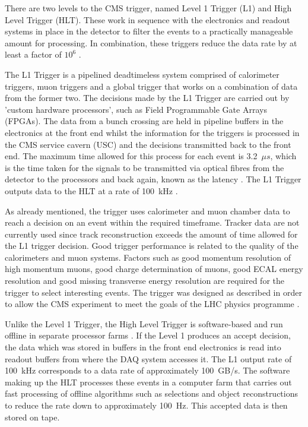 There are two levels to the CMS trigger, named Level 1 Trigger (L1) and High Level Trigger (HLT). These work
in sequence with the electronics and readout systems in place in the detector to filter the events to a
practically manageable amount for processing. In combination, these triggers reduce the data rate by at least
a factor of $10^{6}$ \cite{CMS_experiment}.

The L1 Trigger is a pipelined deadtimeless system comprised of calorimeter triggers, muon triggers and a
global trigger that works on a combination of data from the former two. The decisions made by the L1 Trigger
are carried out by 'custom hardware processors', such as Field Programmable Gate Arrays (FPGAs). The data from
a bunch crossing are held in pipeline buffers in the electronics at the front end whilst the information for
the triggers is processed in the CMS service cavern (USC) and the decisions transmitted back to the front end.
The maximum time allowed for this process for each event is 3.2~$\mu s$, which is the time taken for the
signals to be transmitted via optical fibres from the detector to the processors and back again, known as the
latency \cite{CMS_TDR1}. The L1 Trigger outputs data to the HLT at a rate of 100~kHz \cite{CMS_experiment}.

As already mentioned, the trigger uses calorimeter and muon chamber data to reach a decision on an event
within the required timeframe. Tracker data are not currently used since track reconstruction exceeds the
amount of time allowed for the L1 trigger decision. Good trigger performance is related to the quality of the
calorimeters and muon systems. Factors such as good momentum resolution of high momentum muons, good charge
determination of muons, good ECAL energy resolution and good missing transverse energy resolution are required
for the trigger to select interesting events. The trigger was designed as described in order to allow the CMS
experiment to meet the goals of the LHC physics programme \cite{CMS_experiment}.

Unlike the Level 1 Trigger, the High Level Trigger is software-based and run offline in separate processor
farms \cite{CMS_TDR1}. If the Level 1 produces an accept decision, the data which was stored in buffers in the front end
electronics is read into readout buffers from where the DAQ system accesses it. The L1 output rate of 100~kHz
corresponds to a data rate of approximately 100~GB/s. The software making up the HLT processes these events in
a computer farm that carries out fast processing of offline algorithms such as selections and object
reconstructions to reduce the rate down to approximately 100~Hz. This accepted data is then stored on tape.

